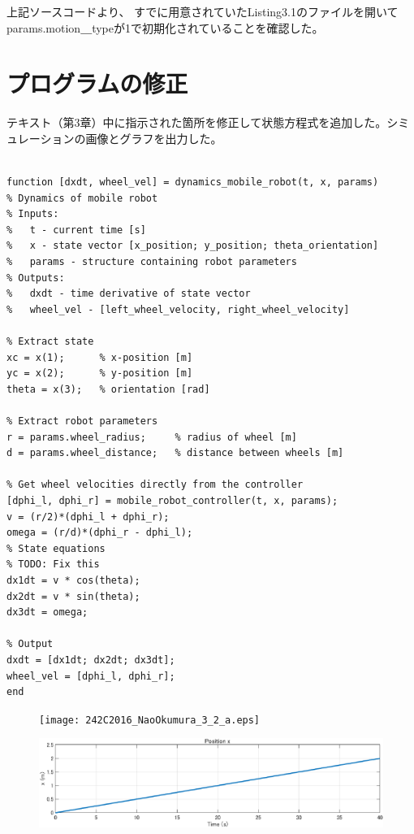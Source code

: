 \documentclass[10pt,a4paper,titlepage]{jreport} %
\begin{document}
上記ソースコードより、
すでに用意されていたListing3.1のファイルを開いてparams.motion＿typeが1で初期化されていることを確認した。

\section{プログラムの修正}

テキスト（第3章）中に指示された箇所を修正して状態方程式を追加した。シミュレーションの画像とグラフを出力した。

\begin{lstlisting}[caption=modified＿dynamics＿mobile＿robot.m]

function [dxdt, wheel_vel] = dynamics_mobile_robot(t, x, params)
% Dynamics of mobile robot
% Inputs:
%   t - current time [s]
%   x - state vector [x_position; y_position; theta_orientation]
%   params - structure containing robot parameters
% Outputs:
%   dxdt - time derivative of state vector
%   wheel_vel - [left_wheel_velocity, right_wheel_velocity]

% Extract state
xc = x(1);      % x-position [m]
yc = x(2);      % y-position [m]
theta = x(3);   % orientation [rad]

% Extract robot parameters
r = params.wheel_radius;     % radius of wheel [m]
d = params.wheel_distance;   % distance between wheels [m]

% Get wheel velocities directly from the controller
[dphi_l, dphi_r] = mobile_robot_controller(t, x, params);
v = (r/2)*(dphi_l + dphi_r);
omega = (r/d)*(dphi_r - dphi_l);
% State equations
% TODO: Fix this
dx1dt = v * cos(theta);
dx2dt = v * sin(theta);
dx3dt = omega;

% Output
dxdt = [dx1dt; dx2dt; dx3dt];
wheel_vel = [dphi_l, dphi_r];
end

\end{lstlisting}

\begin{figure}[H] %
  \centering
  \texttt{[image: 242C2016\_NaoOkumura\_3\_2\_a.eps]} %
\end{figure}

\begin{figure}[H] %
  \centering
  \includegraphics[width=0.6\linewidth]{242C2016_NaoOkumura_3_2_b.eps} %
\end{figure}
\end{document}
